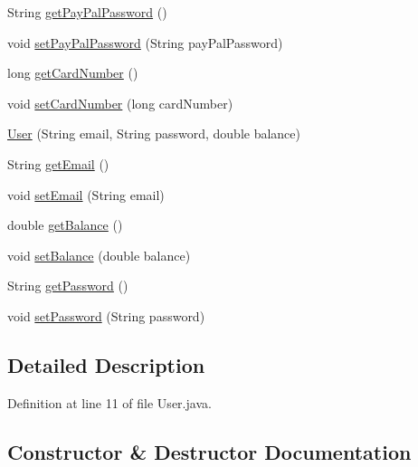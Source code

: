 \begin{DoxyCompactItemize}
\item 
String \mbox{\hyperlink{class_s_p_q_1_1data_1_1_user_aa3a0bdf1676addb67307fa9a66495fa4}{get\+Pay\+Pal\+Password}} ()
\item 
void \mbox{\hyperlink{class_s_p_q_1_1data_1_1_user_a61ca04ab3f3c854aa272f3097b355eb9}{set\+Pay\+Pal\+Password}} (String pay\+Pal\+Password)
\item 
long \mbox{\hyperlink{class_s_p_q_1_1data_1_1_user_ab847d5c61fe4980ae2a15a537b22939b}{get\+Card\+Number}} ()
\item 
void \mbox{\hyperlink{class_s_p_q_1_1data_1_1_user_a6d98a72cb61e95f5417e10e0ba80afab}{set\+Card\+Number}} (long card\+Number)
\item 
\mbox{\hyperlink{class_s_p_q_1_1data_1_1_user_aa21a25c33b963c3af6fb07331f4cd400}{User}} (String email, String password, double balance)
\item 
String \mbox{\hyperlink{class_s_p_q_1_1data_1_1_user_a4f3ae0062ee7529314a5b791707ff4b4}{get\+Email}} ()
\item 
void \mbox{\hyperlink{class_s_p_q_1_1data_1_1_user_ab7132f971882fb88afc6999cf5473ef4}{set\+Email}} (String email)
\item 
double \mbox{\hyperlink{class_s_p_q_1_1data_1_1_user_a03cc880edbf4758b44318af1587824e5}{get\+Balance}} ()
\item 
void \mbox{\hyperlink{class_s_p_q_1_1data_1_1_user_ab9b205d96fa6c53cc3956c2ddcc9c4a7}{set\+Balance}} (double balance)
\item 
String \mbox{\hyperlink{class_s_p_q_1_1data_1_1_user_a688c1eadd21594d52967d87289e23ce2}{get\+Password}} ()
\item 
void \mbox{\hyperlink{class_s_p_q_1_1data_1_1_user_aa5bcf362d3c9c4746f406239bcb041f5}{set\+Password}} (String password)
\end{DoxyCompactItemize}


\subsection{Detailed Description}


Definition at line 11 of file User.\+java.



\subsection{Constructor \& Destructor Documentation}
\mbox{\label{class_s_p_q_1_1data_1_1_user_acc8d4cd3f95c3da8a14117c6057a3e8b}} 
